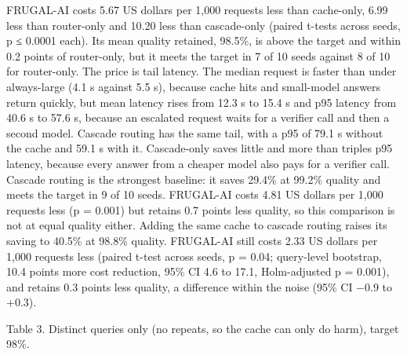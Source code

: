 \documentclass[
  10pt,
]{article}
\begin{document}
FRUGAL-AI costs 5.67 US dollars per 1,000 requests less than cache-only,
6.99 less than router-only and 10.20 less than cascade-only (paired
t-tests across seeds, p ≤ 0.0001 each). Its mean quality retained,
98.5\%, is above the target and within 0.2 points of router-only, but it
meets the target in 7 of 10 seeds against 8 of 10 for router-only. The
price is tail latency. The median request is faster than under
always-large (4.1 s against 5.5 s), because cache hits and small-model
answers return quickly, but mean latency rises from 12.3 s to 15.4 s and
p95 latency from 40.6 s to 57.6 s, because an escalated request waits
for a verifier call and then a second model. Cascade routing has the
same tail, with a p95 of 79.1 s without the cache and 59.1 s with it.
Cascade-only saves little and more than triples p95 latency, because
every answer from a cheaper model also pays for a verifier call. Cascade
routing is the strongest baseline: it saves 29.4\% at 99.2\% quality and
meets the target in 9 of 10 seeds. FRUGAL-AI costs 4.81 US dollars per
1,000 requests less (p = 0.001) but retains 0.7 points less quality, so
this comparison is not at equal quality either. Adding the same cache to
cascade routing raises its saving to 40.5\% at 98.8\% quality. FRUGAL-AI
still costs 2.33 US dollars per 1,000 requests less (paired t-test
across seeds, p = 0.04; query-level bootstrap, 10.4 points more cost
reduction, 95\% CI 4.6 to 17.1, Holm-adjusted p = 0.001), and retains
0.3 points less quality, a difference within the noise (95\% CI −0.9 to
+0.3).

Table 3. Distinct queries only (no repeats, so the cache can only do
harm), target 98\%.
\end{document}
